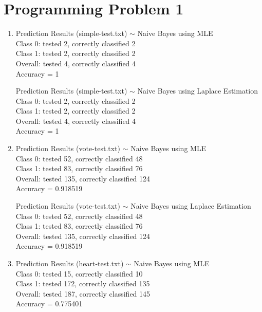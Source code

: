 \documentclass[12pt]{article}
\begin{document}
      \section*{Programming Problem 1}
         \begin{enumerate}
            \item
               Prediction Results (simple-test.txt) $\sim$ Naive Bayes using MLE\\
               Class 0: tested 2, correctly classified 2\\
               Class 1: tested 2, correctly classified 2\\
               Overall: tested 4, correctly classified 4\\
               Accuracy = 1

               Prediction Results (simple-test.txt) $\sim$
                  Naive Bayes using Laplace Estimation\\
               Class 0: tested 2, correctly classified 2\\
               Class 1: tested 2, correctly classified 2\\
               Overall: tested 4, correctly classified 4\\
               Accuracy = 1

            \item
               Prediction Results (vote-test.txt) $\sim$ Naive Bayes using MLE\\
               Class 0: tested 52, correctly classified 48\\
               Class 1: tested 83, correctly classified 76\\
               Overall: tested 135, correctly classified 124\\
               Accuracy = 0.918519

               Prediction Results (vote-test.txt) $\sim$
                  Naive Bayes using Laplace Estimation\\
               Class 0: tested 52, correctly classified 48\\
               Class 1: tested 83, correctly classified 76\\
               Overall: tested 135, correctly classified 124\\
               Accuracy = 0.918519\

            \item
               Prediction Results (heart-test.txt) $\sim$ Naive Bayes using MLE \\
               Class 0: tested 15, correctly classified 10\\
               Class 1: tested 172, correctly classified 135\\
               Overall: tested 187, correctly classified 145\\
               Accuracy = 0.775401


\end{enumerate}
\end{document}
